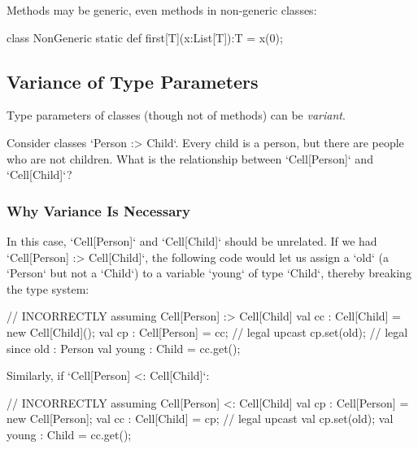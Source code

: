 Methods may be generic, even methods in non-generic classes: 
\begin{xten}
class NonGeneric {
  static def first[T](x:List[T]):T = x(0);
}
\end{xten}
%


\subsection{Variance of Type Parameters}

% 
% 
% 
% 
% 
% 
% 

Type parameters of classes (though not of methods) can be {\em variant}.

Consider classes \xcd`Person :> Child`.  Every child is a person, but there
are people who are not children.  What is the relationship between
\xcd`Cell[Person]` and \xcd`Cell[Child]`?  

\subsubsection{Why Variance Is Necessary}

In this case, \xcd`Cell[Person]` and \xcd`Cell[Child]` should be unrelated.  
If we had \xcd`Cell[Person] :> Cell[Child]`, the following code would let us
assign a \xcd`old` (a \xcd`Person` but not a \xcd`Child`) to a
variable \xcd`young` of type \xcd`Child`, thereby breaking the type system: 
\begin{xten}
// INCORRECTLY assuming Cell[Person] :> Cell[Child]
val cc : Cell[Child] = new Cell[Child]();
val cp : Cell[Person] = cc; // legal upcast
cp.set(old);       // legal since old : Person
val young : Child = cc.get(); 
\end{xten}

Similarly, if \xcd`Cell[Person] <: Cell[Child]`: 
\begin{xten}
// INCORRECTLY assuming Cell[Person] <: Cell[Child]
val cp : Cell[Person] = new Cell[Person];
val cc : Cell[Child] = cp; // legal upcast
val cp.set(old); 
val young : Child = cc.get();
\end{xten}

